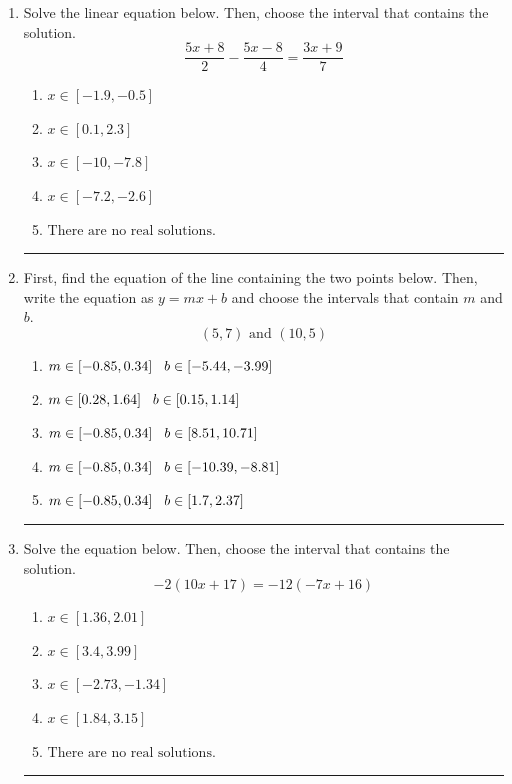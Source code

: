 \documentclass[14pt]{extbook}
\newcommand{\litem}[1]{\item#1\hspace*{-1cm}\rule{\textwidth}{0.4pt}}
\begin{document}
\begin{enumerate}
{\begin{enumerate}[label=\Alph*.]
\end{enumerate} }
\litem{
Solve the linear equation below. Then, choose the interval that contains the solution.\[ \frac{5x + 8}{2} - \frac{5x -8}{4} = \frac{3x + 9}{7} \]\begin{enumerate}[label=\Alph*.]
\item \( x \in [-1.9, -0.5] \)
\item \( x \in [0.1, 2.3] \)
\item \( x \in [-10, -7.8] \)
\item \( x \in [-7.2, -2.6] \)
\item \( \text{There are no real solutions.} \)

\end{enumerate} }
\litem{
First, find the equation of the line containing the two points below. Then, write the equation as $ y=mx+b $ and choose the intervals that contain $m$ and $b$.\[ (5, 7) \text{ and } (10, 5) \]\begin{enumerate}[label=\Alph*.]
\item \( m \in [-0.85, 0.34] \hspace*{3mm} b \in [-5.44, -3.99] \)
\item \( m \in [0.28, 1.64] \hspace*{3mm} b \in [0.15, 1.14] \)
\item \( m \in [-0.85, 0.34] \hspace*{3mm} b \in [8.51, 10.71] \)
\item \( m \in [-0.85, 0.34] \hspace*{3mm} b \in [-10.39, -8.81] \)
\item \( m \in [-0.85, 0.34] \hspace*{3mm} b \in [1.7, 2.37] \)

\end{enumerate} }
\litem{
Solve the equation below. Then, choose the interval that contains the solution.\[ -2(10x + 17) = -12(-7x + 16) \]\begin{enumerate}[label=\Alph*.]
\item \( x \in [1.36, 2.01] \)
\item \( x \in [3.4, 3.99] \)
\item \( x \in [-2.73, -1.34] \)
\item \( x \in [1.84, 3.15] \)
\item \( \text{There are no real solutions.} \)


\end{enumerate}}
\end{enumerate}
\end{document}
